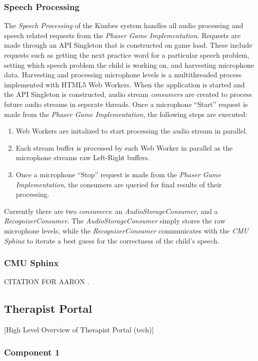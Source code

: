 \documentclass{sig-alternate-2013}
\begin{document}
\subsubsection{Speech Processing}
The {\em Speech Processing} of the Kimbee system handles all audio processing and speech related requests from the {\em Phaser Game Implementation}. Requests are made through an API Singleton that is constructed on game load. These include requests such as getting the next practice word for a particular speech problem, setting which speech problem the child is working on, and harvesting microphone data. Harvesting and processing microphone levels is a multithreaded process implemented with HTML5 Web Workers. When the application is started and the API Singleton is constructed, audio stream {\em consumers} are created to process future audio streams in seperate threads. Once a microphone ``Start'' request is made from the {\em Phaser Game Implementation}, the following steps are executed:
\begin{enumerate}
  \item
    Web Workers are initalized to start processing the audio stream in parallel.
  \item
    Each stream buffer is processed by each Web Worker in parallel as the microphone streams raw Left-Right buffers.
  \item
    Once a microphone ``Stop'' request is made from the {\em Phaser Game Implementation}, the consumers are queried for final results of their processing.
\end{enumerate}
Currently there are two {\em consumers}: an {\em AudioStorageConsumer}, and a {\em RecognizerConsumer}. The {\em AudioStorageConsumer} simply stores the raw microphone levels, while the {\em RecognizerConsumer} communicates with the {\em CMU Sphinx} to iterate a best guess for the correctness of the child's speech.

\subsubsection{CMU Sphinx}

CITATION FOR AARON \cite{CMU:Sphinx}.


\subsection{Therapist Portal}

[High Level Overview of Therapist Portal (tech)]

\subsubsection{Component 1}
\end{document}
